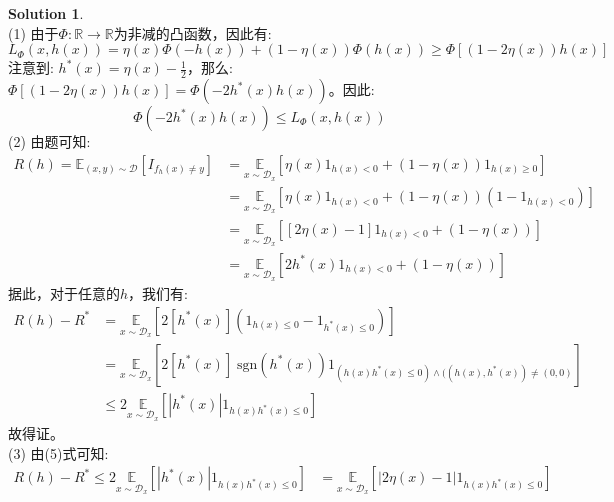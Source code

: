 \documentclass[a4paper,UTF8]{article}
\theoremstyle{definition}
\newtheorem*{solution}{Solution}
\begin{document}
\begin{solution}
~\\(1) 由于$\Phi:\mathbb{R}\rightarrow\mathbb{R}$为非减的凸函数，因此有:
$$L_{\Phi}(x, h(x)) = \eta(x) \Phi(-h(x))+(1-\eta(x)) \Phi(h(x)) \geqslant \Phi[(1-2\eta(x))h(x)]$$
注意到: $h^*(x)=\eta(x)-\frac{1}{2}$，那么: $\Phi[(1-2\eta(x))h(x)] = \Phi\left(-2 h^{*}(x) h(x)\right)$。因此:
	$$\Phi\left(-2 h^{*}(x) h(x)\right)\leqslant L_{\Phi}(x, h(x))$$
 (2) 由题可知: 
	\begin{equation}\nonumber	
	\begin{aligned}
	R(h)=\mathbb{E}_{(x, y) \sim \mathcal{D}}\left[I_{f_{h}(x) \neq y}\right] &= \underset{x \sim \mathcal{D}_{x}}{\mathbb{E}}\left[\eta(x) 1_{h(x)<0}+(1-\eta(x))1_{h(x)\geqslant 0}\right]\\&=\underset{x \sim \mathcal{D}_{x}}{\mathbb{E}}\left[\eta(x) 1_{h(x)<0}+(1-\eta(x))(1-1_{h(x)< 0})\right]\\&=\underset{x \sim \mathcal{D}_{x}}{\mathbb{E}}\left[\left[2\eta(x)-1\right] 1_{h(x)<0}+(1-\eta(x))\right] \\&= \underset{x \sim \mathcal{D}_{x}}{\mathbb{E}}\left[2 h^{*}(x) 1_{h(x)<0}+(1-\eta(x))\right]
	\end{aligned}
	\end{equation}	 
	据此，对于任意的$h$，我们有:			
	\begin{equation}\nonumber	
	\begin{aligned}
	R(h)-R^* &= \underset{x \sim \mathcal{D}_{x}}{\mathbb{E}} \left[2[h^*(x)](1_{h(x)\leqslant 0} - 1_{h^*(x)\leqslant 0})\right] \\&= \underset{x \sim \mathcal{D}_{x}}{\mathbb{E}} \left[2[h^*(x)]\;\text{sgn}(h^*(x))1_{(h(x)h^*(x)\leqslant 0)\land ((h(x),h^*(x))\neq (0,0)}\right] \\&\leqslant 2 \underset{x \sim \mathcal{D}_{x}}{\mathbb{E}}\left[\left|h^{*}(x)\right| 1_{h(x) h^{*}(x) \leqslant 0}\right]
	\end{aligned}
	\end{equation}
	故得证。
 \\(3) 由(5)式可知:			
	\begin{equation}\nonumber	
	\begin{aligned}
	R(h)-R^* \leqslant 2 \underset{x \sim \mathcal{D}_{x}}{\mathbb{E}}\left[\left|h^{*}(x)\right| 1_{h(x) h^{*}(x) \leqslant 0}\right] &= \underset{x \sim \mathcal{D}_{x}}{\mathbb{E}}\left[\left|2\eta(x)-1\right| 1_{h(x) h^{*}(x) \leqslant 0}\right]
	\end{aligned}
	\end{equation}	

\end{solution}
\end{document}
